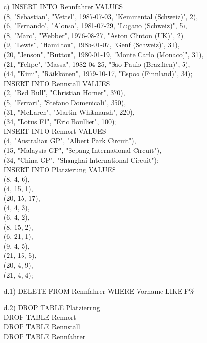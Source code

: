 \documentclass[ngerman]{gdb-aufgabenblatt}
\begin{document}
\begin{enumerate}
	          
	\item[c)] INSERT INTO Rennfahrer VALUES\\
			  (8, "Sebastian", "Vettel", 1987-07-03, "Kemmental (Schweiz)", 2),\\
			  (6, "Fernando", "Alonso", 1981-07-29, "Lugano (Schweiz)", 5),\\
			  (8, "Marc", "Webber", 1976-08-27, "Aston Clinton (UK)", 2),\\
			  (9, "Lewis", "Hamilton", 1985-01-07, "Genf (Schweiz)", 31),\\
			  (20, "Jenson", "Button", 1980-01-19, "Monte Carlo (Monaco)", 31),\\
			  (21, "Felipe", "Massa", 1982-04-25, "S\"ao Paulo (Brazilien)", 5),\\
			  (44, "Kimi", "R\"aikk\"onen", 1979-10-17, "Espoo (Finnland)", 34);\\
			  
			  INSERT INTO Rennstall VALUES\\
			  (2, "Red Bull", "Christian Horner", 370),\\
			  (5, "Ferrari", "Stefano Domenicali", 350),\\
			  (31, "McLaren", "Martin Whitmarsh", 220),\\
			  (34, "Lotus F1", "Eric Boullier", 100);\\
			  
			  INSERT INTO Rennort VALUES\\
			  (4, "Australian GP", "Albert Park Circuit"),\\
			  (15, "Malaysia GP", "Sepang International Circuit"),\\
			  (34, "China GP", "Shanghai International Circuit");\\
			  
			  INSERT INTO Platzierung VALUES\\
			  (8, 4, 6),\\
			  (4, 15, 1),\\
			  (20, 15, 17),\\
			  (4, 4, 3),\\
			  (6, 4, 2),\\
			  (8, 15, 2),\\
			  (6, 21, 1),\\
			  (9, 4, 5),\\
			  (21, 15, 5),\\
			  (20, 4, 9),\\
			  (21, 4, 4);\\
			     
	\item[d.1)] DELETE FROM Rennfahrer WHERE Vorname LIKE F\%
	\item[d.2)] DROP TABLE Platzierung\\
				DROP TABLE Rennort\\
	            DROP TABLE Rennstall\\
		        DROP TABLE Rennfahrer
		
\end{enumerate} 
\end{document}
